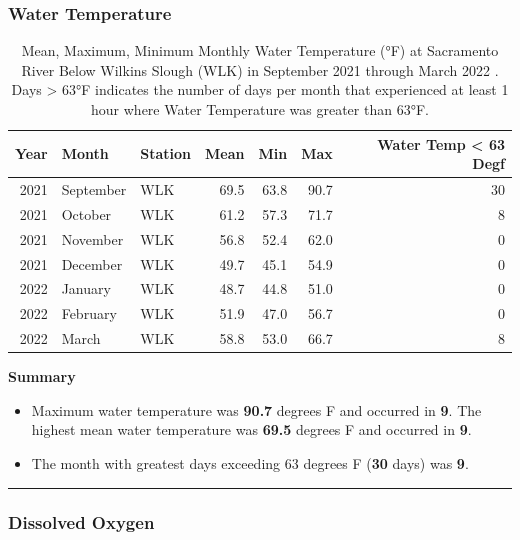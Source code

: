 \documentclass[
]{book}
\providecommand{\tightlist}{%
  \setlength{\itemsep}{0pt}\setlength{\parskip}{0pt}}
\theoremstyle{definition}
\theoremstyle{definition}
\theoremstyle{definition}
\theoremstyle{definition}
\theoremstyle{remark}
\begin{document}
\hypertarget{water-temperature-2}{%
\subsubsection{Water Temperature}\label{water-temperature-2}}

\begin{table}
\centering
\caption{Mean, Maximum, Minimum Monthly Water Temperature (°F) at Sacramento River Below Wilkins Slough (WLK) in September 2021 through March 2022 . Days > 63°F indicates the number of days per month that experienced at least 1 hour where Water Temperature was greater than 63°F.}
\centering
\begin{tabular}[t]{rllrrrr}
\hline
Year & Month & Station & Mean & Min & Max & Water Temp < 63 Degf\\
\hline
2021 & September & WLK & 69.5 & 63.8 & 90.7 & 30\\
\hline
2021 & October & WLK & 61.2 & 57.3 & 71.7 & 8\\
\hline
2021 & November & WLK & 56.8 & 52.4 & 62.0 & 0\\
\hline
2021 & December & WLK & 49.7 & 45.1 & 54.9 & 0\\
\hline
2022 & January & WLK & 48.7 & 44.8 & 51.0 & 0\\
\hline
2022 & February & WLK & 51.9 & 47.0 & 56.7 & 0\\
\hline
2022 & March & WLK & 58.8 & 53.0 & 66.7 & 8\\
\hline
\end{tabular}
\end{table}

\textbf{Summary}

\begin{itemize}
\tightlist
\item
  Maximum water temperature was \textbf{90.7} degrees F and occurred in \textbf{9}. The highest mean water temperature was \textbf{69.5} degrees F and occurred in \textbf{9}.
\item
  The month with greatest days exceeding 63 degrees F (\textbf{30} days) was \textbf{9}.
\end{itemize}

\begin{center}\rule{0.5\linewidth}{0.5pt}\end{center}

\hypertarget{dissolved-oxygen-1}{%
\subsubsection{Dissolved Oxygen}\label{dissolved-oxygen-1}}
\end{document}
